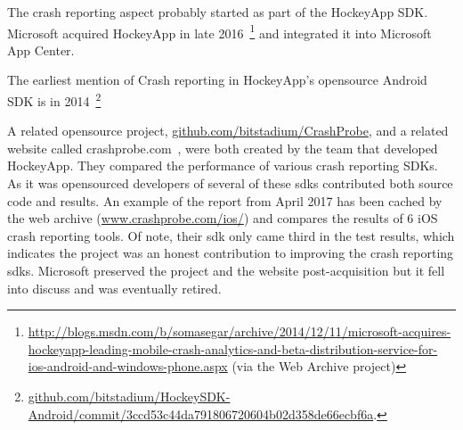 The crash reporting aspect probably started as part of the HockeyApp SDK. Microsoft acquired HockeyApp in late 2016~\footnote{\href{https://web.archive.org/web/20150702124106/http://blogs.msdn.com/b/somasegar/archive/2014/12/11/microsoft-acquires-hockeyapp-leading-mobile-crash-analytics-and-beta-distribution-service-for-ios-android-and-windows-phone.aspx}{http://blogs.msdn.com/b/somasegar/archive/2014/12/11/microsoft-acquires-hockeyapp-leading-mobile-crash-analytics-and-beta-distribution-service-for-ios-android-and-windows-phone.aspx} (via the Web Archive project)} and integrated it into Microsoft App Center. 

The earliest mention of Crash reporting in HockeyApp's opensource Android SDK is in 2014~\footnote{\href{https://github.com/bitstadium/HockeySDK-Android/commit/3ccd53c44da791806720604b02d358de66ecbf6a}{github.com/bitstadium/HockeySDK-Android/commit/3ccd53c44da791806720604b02d358de66ecbf6a}.}

A related opensource project, \href{https://github.com/bitstadium/CrashProbe}{github.com/bitstadium/CrashProbe}, and a related website called crashprobe.com~, were both created by the team that developed HockeyApp. They compared the performance of various crash reporting SDKs. As it was opensourced developers of several of these \Glspl{sdk} contributed both source code and results. An example of the report from April 2017 has been cached by the web archive (\href{https://web.archive.org/web/20170412015831/http://www.crashprobe.com/ios/}{www.crashprobe.com/ios/}) and compares the results of 6 iOS crash reporting tools. Of note, their \Gls{sdk} only came third in the test results, which indicates the project was an honest contribution to improving the crash reporting \Glspl{sdk}. Microsoft preserved the project and the website post-acquisition but it fell into discuss and was eventually retired.

